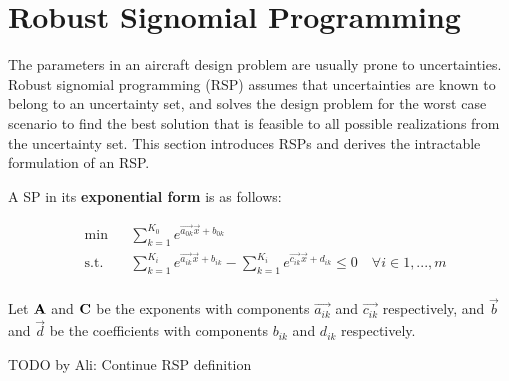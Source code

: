 \section{Robust Signomial Programming} \label{RSP}
The parameters in an aircraft design problem are usually prone to uncertainties. Robust signomial programming (RSP) assumes that uncertainties are known to belong to an uncertainty set, and solves the design problem for the worst case scenario to find the best solution that is feasible to all possible realizations from the uncertainty set. This section introduces RSPs and derives the intractable formulation of an RSP.

A SP in its \textbf{exponential form} is as follows:

\begin{equation}
\begin{aligned}
	& \min && \textstyle{\sum}_{k=1}^{K_0}e^{\vec{a_{0k}}\vec{x} + b_{0k}} \\
	& \text{s.t.} && \textstyle{\sum}_{k=1}^{K_i}e^{\vec{a_{ik}}\vec{x} + b_{ik}} - \textstyle{\sum}_{k=1}^{K_i}e^{\vec{c_{ik}}\vec{x} + d_{ik}} \leq 0 \quad \forall i \in 1,...,m\\
\end{aligned}
\label{SP_exponential}
\end{equation}

Let $\mathbf{A}$ and $\mathbf{C}$ be the exponents with components $\vec{a_{ik}}$ and $\vec{c_{ik}}$ respectively, and $\vec{b}$ and $\vec{d}$ be the coefficients with components $b_{ik}$ and $d_{ik}$ respectively.  

TODO by Ali: Continue RSP definition